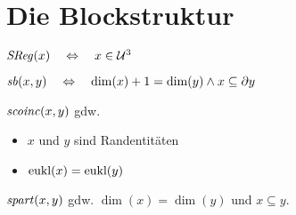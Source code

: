 \section{Die Blockstruktur}

\begin{dfn}
    $\mathit{S\hspace*{-0.25ex}Reg}(x) \quad \Leftrightarrow \quad x \in \mathcal{U}^3$ 
\end{dfn}

\begin{dfn}
    $\mathit{sb}(x,y) \quad \Leftrightarrow \quad \dim(x)+1 = \dim(y) \land x \subseteq \partial y$
\end{dfn}

\begin{dfn}
    $\mathit{scoinc}(x,y)$ gdw.
    \begin{itemize}
        \item $x$ und $y$ sind Randentitäten
        \item $\text{eukl}(x) = \text{eukl}(y)$
    \end{itemize}
\end{dfn}

\begin{dfn}
    $\mathit{spart}(x,y)$ gdw. $\dim(x) = \dim(y)$ und $x \subseteq y$.
\end{dfn}



